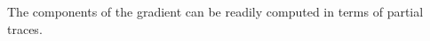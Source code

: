 \documentclass[aos]{imsart}
\theoremstyle{definition}
\numberwithin{equation}{section}
\DeclareMathOperator{\tr}{Tr}
\DeclarePairedDelimiter{\norm}{\lVert}{\rVert}
\newcommand{\ot}{\otimes}
\newcommand{\MW}[1]{{\color{red}[MW: #1]}}
\begin{document}
The components of the gradient can be readily computed in terms of partial traces.

\end{document}
